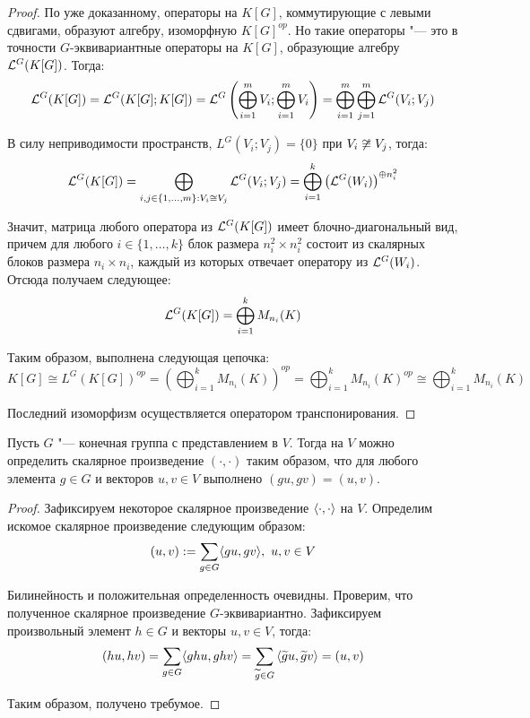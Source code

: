 \begin{proof}
	По уже доказанному, операторы на $K[G]$, коммутирующие с левыми сдвигами, образуют алгебру, изоморфную $K[G]^{op}$. Но такие операторы "--- это в точности $G$-эквивариантные операторы на $K[G]$, образующие алгебру $\mathcal L^G(K[G])$. Тогда:
	\[\mathcal L^G(K[G]) = \mathcal L^G(K[G]; K[G]) = \mathcal L^G\left(\bigoplus_{i=1}^mV_i; \bigoplus_{i=1}^mV_i\right) = \bigoplus_{i = 1}^m\bigoplus_{j=1}^m \mathcal L^G(V_i; V_j)\]
	
	В силу неприводимости пространств, $L^G(V_i; V_j) = \{0\}$ при $V_i \centernot\cong V_j$, тогда:
	\[\mathcal L^G(K[G]) = \bigoplus_{i, j \in \{1, \dotsc, m\}: V_i \cong V_j}\mathcal L^G(V_i; V_j) = \bigoplus_{i = 1}^k\left(\mathcal L^G(W_i)\right)^{\oplus n_i^2}\]
	
	Значит, матрица любого оператора из $\mathcal L^G(K[G])$ имеет блочно-диагональный вид, причем	для любого $i \in \{1, \dotsc, k\}$ блок размера $n_i^2 \times n_i^2$ состоит из скалярных блоков размера $n_i \times n_i$, каждый из которых отвечает оператору из $\mathcal L^G(W_i)$. Отсюда получаем следующее:
	\[\mathcal L^G(K[G]) = \bigoplus_{i = 1}^kM_{n_i}(K)\]
	
	Таким образом, выполнена следующая цепочка:
	\[K[G] \cong L^G(K[G])^{op} = \left(\bigoplus_{i = 1}^kM_{n_i}(K)\right)^{op} = \bigoplus_{i=1}^kM_{n_i}(K)^{op} \cong \bigoplus_{i=1}^kM_{n_i}(K)\]
	
	Последний изоморфизм осуществляется оператором транспонирования.
\end{proof}

\begin{proposition}
	Пусть $G$ "--- конечная группа с представлением в $V$. Тогда на $V$ можно определить скалярное произведение $(\cdot, \cdot)$ таким образом, что для любого элемента $g \in G$ и векторов $u, v \in V$ выполнено $(gu, gv) = (u, v)$.
\end{proposition}

\begin{proof}
	Зафиксируем некоторое скалярное произведение $\langle \cdot, \cdot \rangle$ на $V$. Определим искомое скалярное произведение следующим образом:
	\[(u, v) := \sum_{g \in G}\langle gu, gv \rangle,~u, v \in V\]
	
	Билинейность и положительная определенность очевидны. Проверим, что полученное скалярное произведение $G$-эквивариантно. Зафиксируем произвольный элемент $h \in G$ и векторы $u, v \in V$, тогда:
	\[(hu, hv) = \sum_{g \in G}\langle ghu, ghv \rangle =  \sum_{\widetilde g \in G}\left\langle \widetilde gu, \widetilde gv \right\rangle = (u, v)\]
	
	Таким образом, получено требумое.
\end{proof}

